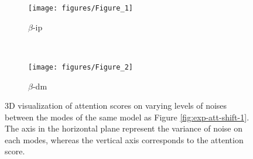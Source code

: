 \begin{figure}[!h]
\centering
\begin{subfigure}{\textwidth}
  \centering
  \texttt{[image: figures/Figure\_1]} 
  \caption{$\beta$-ip}
\end{subfigure}\\
\begin{subfigure}{\textwidth}
  \centering
  \texttt{[image: figures/Figure\_2]} 
  \caption{$\beta$-dm}
\end{subfigure}
\caption[3D visualization of attention scores on varying levels of noises]{3D visualization of attention scores on varying levels of noises between the modes of the same model as Figure \ref{fig:exp-att-shift-1}. The axis in the horizontal plane represent the variance of noise on each modes, whereas the vertical axis corresponds to the attention score.}
\label{fig:mesh}
\end{figure}

